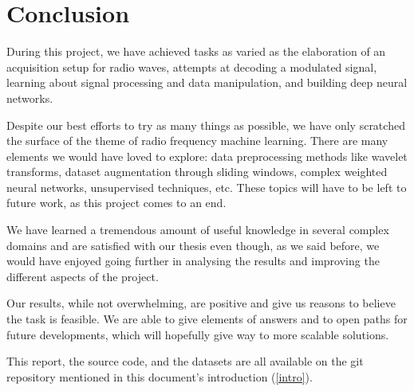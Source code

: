 \section{Conclusion}

During this project, we have achieved tasks as varied as the elaboration of an acquisition setup for radio waves, attempts at decoding a modulated signal, learning about signal processing and data manipulation, and building deep neural networks.

Despite our best efforts to try as many things as possible, we have only scratched the surface of the theme of radio frequency machine learning. There are many elements we would have loved to explore: data preprocessing methods like wavelet transforms, dataset augmentation through sliding windows, complex weighted neural networks, unsupervised techniques, etc. These topics will have to be left to future work, as this project comes to an end.

We have learned a tremendous amount of useful knowledge in several complex domains and are satisfied with our thesis even though, as we said before, we would have enjoyed going further in analysing the results and improving the different aspects of the project.

Our results, while not overwhelming, are positive and give us reasons to believe the task is feasible. We are able to give elements of answers and to open paths for future developments, which will hopefully give way to more scalable solutions.

This report, the source code, and the datasets are all available on the git repository mentioned in this document's introduction (\ref{intro}).
